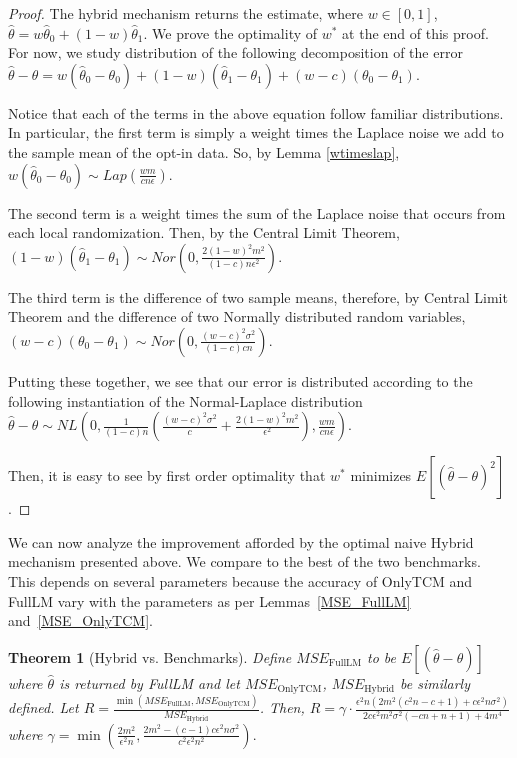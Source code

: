 \documentclass{article}
\theoremstyle{plain}
\newtheorem{thm}{Theorem}[section]
\begin{document}
\begin{proof}
The hybrid mechanism returns the estimate, where $w \in [0,1]$,
$\hat{\theta} = w\hat{\theta}_0 + (1-w)\hat{\theta}_1.$
We prove the optimality of $w^*$ at the end of this proof. For now, we study distribution of the following decomposition of the error
$\hat{\theta} - \theta = w(\hat{\theta}_0 - \theta_0) + (1-w)(\hat{\theta}_1 - \theta_1) + (w-c)(\theta_0 - \theta_1).$

Notice that each of the terms in the above equation follow familiar distributions. In particular, the first term is simply a weight times the Laplace noise we add to the sample mean of the opt-in data. So, by Lemma \ref{wtimeslap},
$w(\hat{\theta}_0 - \theta_0) \sim Lap\left(\frac{wm}{cn\epsilon}\right).$

The second term is a weight times the sum of the Laplace noise that occurs from each local randomization. Then, by the Central Limit Theorem,
$(1-w)(\hat{\theta}_1 - \theta_1) \sim Nor\left(0, \frac{2(1-w)^2 m^2}{(1-c)n\epsilon^2}\right).$

The third term is the difference of two sample means, therefore, by Central Limit Theorem and the difference of two Normally distributed random variables, 
$(w-c)(\theta_0 - \theta_1) \sim Nor\left(0, \frac{(w-c)^2\sigma^2}{(1-c)cn}\right).$

Putting these together, we see that our error is distributed according to the following instantiation of the Normal-Laplace distribution
$\hat{\theta} - \theta \sim NL\left(0, \frac{1}{(1-c)n}\left(\frac{(w-c)^2\sigma^2}{c} + \frac{2(1-w)^2 m^2}{\epsilon^2}\right), \frac{wm}{cn\epsilon}\right).$

Then, it is easy to see by first order optimality that $w^*$ minimizes $E[(\hat{\theta} - \theta)^2]$.
\end{proof}

We can now analyze the improvement afforded by the optimal naive Hybrid mechanism presented above. We compare to the best of the two benchmarks. This depends on several parameters because the accuracy of OnlyTCM and FullLM vary with the parameters as per Lemmas~\ref{MSE_FullLM} and~\ref{MSE_OnlyTCM}. 

\begin{thm}[Hybrid vs. Benchmarks]
Define $MSE_{\text{FullLM}}$ to be $E[(\hat{\theta} - \theta)]$ where $\hat{\theta}$ is returned by FullLM and let $MSE_{\text{OnlyTCM}}$, $MSE_{\text{Hybrid}}$ be similarly defined.
Let 
$R = \frac{\min(MSE_{\text{FullLM}}, MSE_{\text{OnlyTCM}})}{MSE_{\text{Hybrid}}}$.
Then, 
$R = \gamma \cdot \frac{\epsilon^2 n \left(2 m^2 \left(c^2 n-c+1\right)+c \epsilon^2 n \sigma^2\right)}{2 c \epsilon^2 m^2 \sigma^2 (-c n+n+1)+4 m^4}$
where 
$\gamma = \min \left(\frac{2 m^2}{\epsilon^2 n},\frac{2 m^2-(c-1) c \epsilon^2 n \sigma^2}{c^2 \epsilon^2 n^2}\right).$
\end{thm}
\end{document}
